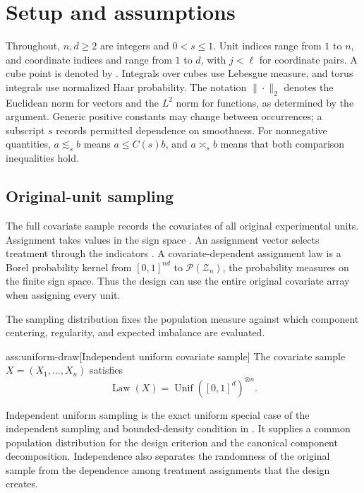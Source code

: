 \section{Setup and assumptions}

Throughout, \(n,d\geq2\) are integers and \(0<s\leq1\). Unit indices  range from \(1\) to \(n\), and coordinate indices  and  range from \(1\) to \(d\), with \(j<\ell\) for coordinate pairs. A cube point is denoted by . Integrals over cubes use Lebesgue measure, and torus integrals use normalized Haar probability. The notation \(\|\cdot\|_2\) denotes the Euclidean norm for vectors and the \(L^2\) norm for functions, as determined by the argument. Generic positive constants may change between occurrences; a subscript \(s\) records permitted dependence on smoothness. For nonnegative quantities, \(a\lesssim_s b\) means \(a\leq C(s)b\), and \(a\asymp_s b\) means that both comparison inequalities hold.

\subsection{Original-unit sampling}

The full covariate sample  records the covariates of all original experimental units. Assignment takes values in the sign space . An assignment vector  selects treatment through the indicators . A covariate-dependent assignment law  is a Borel probability kernel from \([0,1]^{nd}\) to \(\mathcal P(\mathcal Z_n)\), the probability measures on the finite sign space. Thus the design can use the entire original covariate array when assigning every unit.

The sampling distribution fixes the population measure against which component centering, regularity, and expected imbalance are evaluated.

\begin{assumptionv}{ass:uniform-draw}[Independent uniform covariate sample]
The covariate sample \(X=(X_1,\ldots,X_n)\) satisfies
\[
\operatorname{Law}(X)=\operatorname{Unif}([0,1]^d)^{\otimes n}.
\]
\end{assumptionv}

Independent uniform sampling is the exact uniform special case of the independent sampling and bounded-density condition in \citep[Assumption 2.1]{Cytrynbaum2026Limits}. It supplies a common population distribution for the design criterion and the canonical component decomposition. Independence also separates the randomness of the original sample from the dependence among treatment assignments that the design creates.

